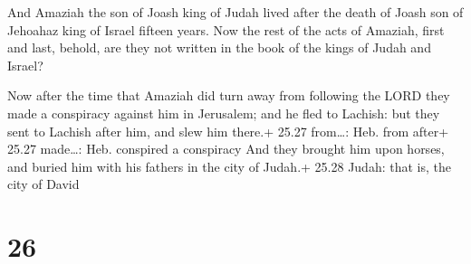  And Amaziah the son of Joash king of Judah lived after
the death of Joash son of Jehoahaz king of Israel fifteen years.
 Now the rest of the acts of Amaziah, first and last,
behold, are they not written in the book of the kings of Judah and
Israel?

 Now after the time that Amaziah did turn away from
following the LORD they made a conspiracy against him in Jerusalem; and
he fled to Lachish: but they sent to Lachish after him, and slew him
there.+ 25.27 from\ldots: Heb. from after+ 25.27 made\ldots: Heb.
conspired a conspiracy  And they brought him upon horses,
and buried him with his fathers in the city of Judah.+ 25.28 Judah: that
is, the city of David

\hypertarget{section-25}{%
\section{26}\label{section-25}}

